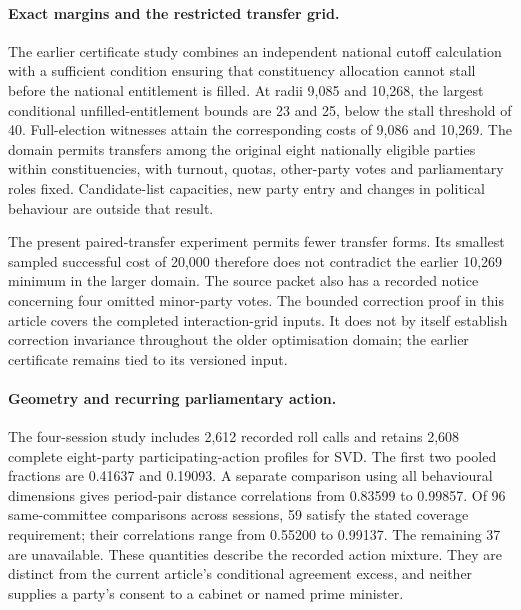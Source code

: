 \paragraph{Exact margins and the restricted transfer grid.}
The earlier certificate study combines an independent national cutoff calculation with a sufficient condition ensuring that constituency allocation cannot stall before the national entitlement is filled. At radii 9,085 and 10,268, the largest conditional unfilled-entitlement bounds are 23 and 25, below the stall threshold of 40. Full-election witnesses attain the corresponding costs of 9,086 and 10,269. The domain permits transfers among the original eight nationally eligible parties within constituencies, with turnout, quotas, other-party votes and parliamentary roles fixed. Candidate-list capacities, new party entry and changes in political behaviour are outside that result.

The present paired-transfer experiment permits fewer transfer forms. Its smallest sampled successful cost of 20,000 therefore does not contradict the earlier 10,269 minimum in the larger domain. The source packet also has a recorded notice concerning four omitted minor-party votes. The bounded correction proof in this article covers the completed interaction-grid inputs. It does not by itself establish correction invariance throughout the older optimisation domain; the earlier certificate remains tied to its versioned input.

\paragraph{Geometry and recurring parliamentary action.}
The four-session study includes 2,612 recorded roll calls and retains 2,608 complete eight-party participating-action profiles for SVD. The first two pooled fractions are 0.41637 and 0.19093. A separate comparison using all behavioural dimensions gives period-pair distance correlations from 0.83599 to 0.99857. Of 96 same-committee comparisons across sessions, 59 satisfy the stated coverage requirement; their correlations range from 0.55200 to 0.99137. The remaining 37 are unavailable. These quantities describe the recorded action mixture. They are distinct from the current article's conditional agreement excess, and neither supplies a party's consent to a cabinet or named prime minister.

